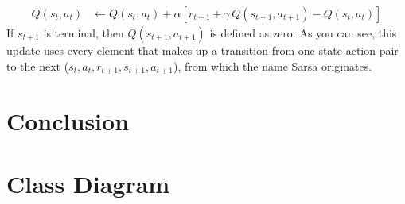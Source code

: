 \documentclass{article}
\begin{document}
\begin{align*}
Q(s_t,a_t) & \leftarrow Q(s_t,a_t) + \alpha \left[ r_{t+1} + \gamma \, Q(s_{t+1},a_{t+1}) - Q(s_t,a_t) \right]
\end{align*}
If $s_{t+1}$ is terminal, then $Q(s_{t+1},a_{t+1})$ is defined as zero. As you can see, this update uses every element that makes up a transition from one state-action pair to the next ($s_t,a_t,r_{t+1},s_{t+1},a_{t+1}$), from which the name Sarsa originates.


\section{Conclusion}

\newpage
\nocite{*}



\newpage
\appendix
\appendixpage
\section{Class Diagram} \label{app:classDiagram}
\end{document}
